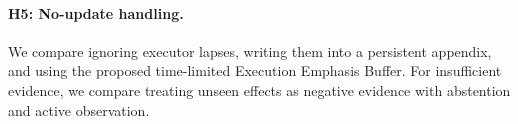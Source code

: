 \paragraph{H5: No-update handling.}
We compare ignoring executor lapses, writing them into a persistent appendix, and using the proposed time-limited Execution Emphasis Buffer. For insufficient evidence, we compare treating unseen effects as negative evidence with abstention and active observation.
